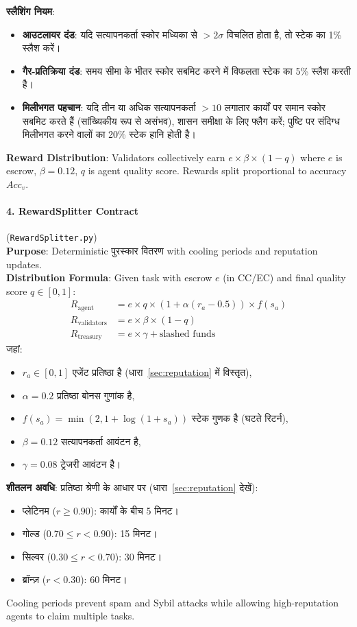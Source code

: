 \documentclass[11pt]{article}
\begin{document}
\textbf{स्लैशिंग नियम}:
\begin{itemize}[noitemsep]
  \item \textbf{आउटलायर दंड}: यदि सत्यापनकर्ता स्कोर मध्यिका से $>2\sigma$ विचलित होता है, तो स्टेक का 1\% स्लैश करें।
  \item \textbf{गैर-प्रतिक्रिया दंड}: समय सीमा के भीतर स्कोर सबमिट करने में विफलता स्टेक का 5\% स्लैश करती है।
  \item \textbf{मिलीभगत पहचान}: यदि तीन या अधिक सत्यापनकर्ता $>10$ लगातार कार्यों पर समान स्कोर सबमिट करते हैं (सांख्यिकीय रूप से असंभव), शासन समीक्षा के लिए फ्लैग करें; पुष्टि पर संदिग्ध मिलीभगत करने वालों का 20\% स्टेक हानि होती है।
\end{itemize}
\textbf{Reward Distribution}: Validators collectively earn $e \times \beta \times (1-q)$ where $e$ is escrow, $\beta=0.12$, $q$ is agent quality score. Rewards split proportional to accuracy $Acc_v$.

\paragraph{4. RewardSplitter Contract} (\texttt{RewardSplitter.py})\\
\textbf{Purpose}: Deterministic पुरस्कार वितरण with cooling periods and reputation updates.\\
\textbf{Distribution Formula}: Given task with escrow $e$ (in CC/EC) and final quality score $q \in [0,1]$:
\begin{align}
R_{\text{agent}} &= e \times q \times \left(1 + \alpha (r_a - 0.5)\right) \times f(s_a) \label{eq:reward-agent} \\
R_{\text{validators}} &= e \times \beta \times (1-q) \label{eq:reward-validators} \\
R_{\text{treasury}} &= e \times \gamma + \text{slashed funds} \label{eq:reward-treasury}
\end{align}
जहां:
\begin{itemize}[noitemsep]
  \item $r_a \in [0,1]$ एजेंट प्रतिष्ठा है (धारा~\ref{sec:reputation} में विस्तृत),
  \item $\alpha = 0.2$ प्रतिष्ठा बोनस गुणांक है,
  \item $f(s_a) = \min(2, 1 + \log(1+s_a))$ स्टेक गुणक है (घटते रिटर्न),
  \item $\beta = 0.12$ सत्यापनकर्ता आवंटन है,
  \item $\gamma = 0.08$ ट्रेजरी आवंटन है।
\end{itemize}
\textbf{शीतलन अवधि}: प्रतिष्ठा श्रेणी के आधार पर (धारा~\ref{sec:reputation} देखें):
\begin{itemize}[noitemsep]
  \item प्लेटिनम ($r \geq 0.90$): कार्यों के बीच 5 मिनट।
  \item गोल्ड ($0.70 \leq r < 0.90$): 15 मिनट।
  \item सिल्वर ($0.30 \leq r < 0.70$): 30 मिनट।
  \item ब्रॉन्ज़ ($r < 0.30$): 60 मिनट।
\end{itemize}
Cooling periods prevent spam and Sybil attacks while allowing high-reputation agents to claim multiple tasks.
\end{document}
